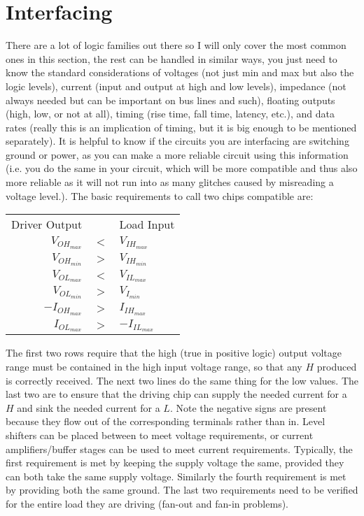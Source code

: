 \section{Interfacing}

There are a lot of logic families out there so I will only cover the most common ones in this section, the rest can be handled in similar ways, you just need to know the standard considerations of voltages (not just min and max but also the logic levels), current (input and output at high and low levels), impedance (not always needed but can be important on bus lines and such), floating outputs (high, low, or not at all), timing (rise time, fall time, latency, etc.), and data rates (really this is an implication of timing, but it is big enough to be mentioned separately).  It is helpful to know if the circuits you are interfacing are switching ground or power, as you can make a more reliable circuit using this information (i.e. you do the same in your circuit, which will be more compatible and thus also more reliable as it will not run into as many glitches caused by misreading a voltage level.).  The basic requirements to call two chips compatible are:

\begin{tabular}{rcl}
Driver Output  && Load Input \\
$V_{OH_{max}}$ & $<$ & $V_{IH_{max}}$\\
$V_{OH_{min}}$ & $>$ & $V_{IH_{min}}$\\
$V_{OL_{max}}$ & $<$ & $V_{IL_{max}}$\\
$V_{OL_{min}}$ & $>$ & $V_{I_{min}}$\\
$-I_{OH_{max}}$ & $>$ & $I_{IH_{max}}$\\
$I_{OL_{max}}$ & $>$ & $-I_{IL_{max}}$\\
\end{tabular}

The first two rows require that the high (true in positive logic) output voltage range must be contained in the high input voltage range, so that any $H$ produced is correctly received.  The next two lines do the same thing for the low values.  The last two are to ensure that the driving chip can supply the needed current for a $H$ and sink the needed current for a $L$.  Note the negative signs are present because they flow out of the corresponding terminals rather than in.  Level shifters can be placed between to meet voltage requirements, or current amplifiers/buffer stages can be used to meet current requirements.  Typically, the first requirement is met by keeping the supply voltage the same, provided they can both take the same supply voltage.  Similarly the fourth requirement is met by providing both the same ground.  The last two requirements need to be verified for the entire load they are driving (fan-out and fan-in problems).

